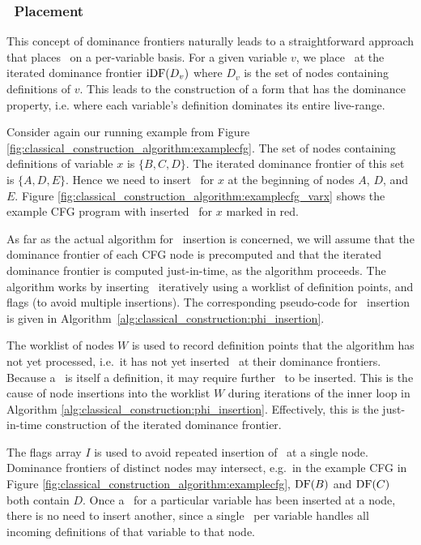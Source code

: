 \subsubsection*{\phiop\ Placement}

This concept of dominance frontiers 
naturally leads to a
straightforward approach that places \phiops\
on a per-variable basis.
For a given variable $v$, we place \phiops\ at the
iterated dominance frontier $\mathrm{iDF}(D_v)$ where
$D_v$ is the set of nodes containing definitions of $v$.
This leads to the construction of a form that has 
the dominance property, i.e. where each variable's definition dominates its entire live-range.

Consider again our running example from Figure 
\ref{fig:classical_construction_algorithm:examplecfg}. The set of nodes containing definitions
of variable
$x$ is $\{ B,C,D \}$. The iterated dominance frontier of this set
is $\{ A, D, E \}$. Hence we need to insert 
\phiops\ for $x$ at the beginning of nodes $A$, $D$, and $E$.
Figure \ref{fig:classical_construction_algorithm:examplecfg_varx} shows the example CFG program
with inserted \phiops\ for $x$ marked in red.



As far as the actual algorithm for \phiops\ insertion
is concerned, we will assume that the dominance
frontier of each CFG node is precomputed and that the iterated dominance frontier is computed just-in-time, as the algorithm proceeds.
The algorithm works by inserting \phiops\ iteratively
using a worklist of definition points, and flags (to avoid multiple
insertions). The corresponding pseudo-code for
\phiop\ insertion is given in
Algorithm~\ref{alg:classical_construction:phi_insertion}.


The worklist of nodes $W$ is used to record definition points that the
algorithm
has not yet processed, i.e.\ it has not yet inserted \phiops\ at their dominance
frontiers.
Because a \phiop\ is itself a 
definition, it may require further \phiops\ to be inserted.
This is the cause of node insertions into the worklist $W$ during
iterations of the inner loop in Algorithm 
\ref{alg:classical_construction:phi_insertion}.
Effectively, this is the just-in-time construction of
the iterated dominance frontier.


The flags array $I$ is used to avoid repeated insertion of \phiops\
at a single node. Dominance
frontiers
of distinct nodes may intersect, e.g.\ in the example CFG in Figure
\ref{fig:classical_construction_algorithm:examplecfg},
$\mathrm{DF}(B)$ and $\mathrm{DF}(C)$ both contain $D$. 
Once a \phiop\ for a particular variable has been
inserted at a node,
there is no need to insert another, since a single \phiop\ per
variable handles all incoming definitions of that variable to that node.

